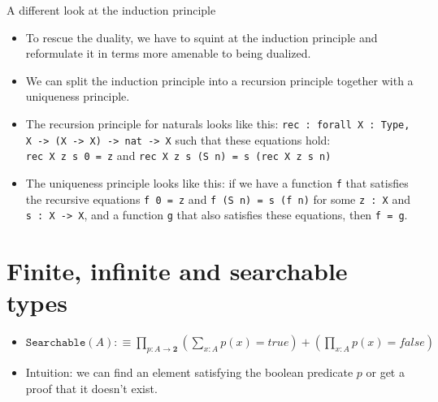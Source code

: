 \documentclass{beamer}
\begin{document}
\begin{frame}{A different look at the induction principle}
\begin{itemize}
	\item To rescue the duality, we have to squint at the induction principle and reformulate it in terms more amenable to being dualized.
	\item We can split the induction principle into a recursion principle together with a uniqueness principle.
	\item The recursion principle for naturals looks like this: \texttt{rec : forall X : Type, X -> (X -> X) -> nat -> X} such that these equations hold: \\ \texttt{rec X z s 0 = z} and \texttt{rec X z s (S n) = s (rec X z s n)}
	\item The uniqueness principle looks like this: if we have a function \texttt{f} that satisfies the recursive equations \texttt{f 0 = z} and \texttt{f (S n) = s (f n)} for some \texttt{z : X} and \texttt{s : X -> X}, and a function \texttt{g} that also satisfies these equations, then \texttt{f = g}.
\end{itemize}
\end{frame}

\section{Finite, infinite and searchable types}

\begin{frame}{}
\begin{itemize}
	\item $\displaystyle \texttt{Searchable}(A) :\equiv \prod_{p : A \to \mathbf{2}} \left(\sum_{x : A} p(x) = true\right) + \left(\prod_{x : A} p(x) = false\right)$
	\item Intuition: we can find an element satisfying the boolean predicate $p$ or get a proof that it doesn't exist.
\end{itemize}
\end{frame}
\end{document}
